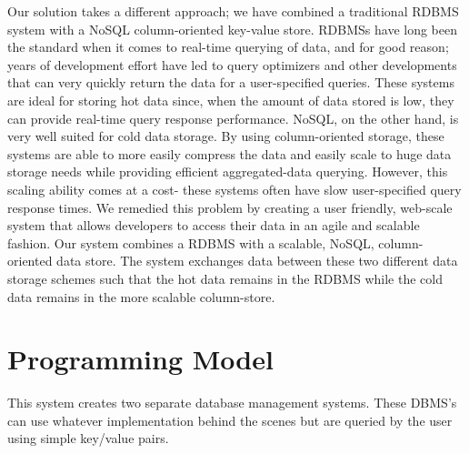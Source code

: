 \documentclass[12pt]{article}
\begin{document}
Our solution takes a different approach; we have combined a traditional RDBMS system with a NoSQL column-oriented key-value store. RDBMSs have long been the standard when it comes to real-time querying of data, and for good reason; years of development effort have led to query optimizers and other developments that can very quickly return the data for a user-specified queries. These systems are ideal for storing hot data since, when the amount of data stored is low, they can provide real-time query response performance. NoSQL, on the other hand, is very well suited for cold data storage. By using column-oriented storage, these systems are able to more easily compress the data and easily scale to huge data storage needs while providing efficient aggregated-data querying. However, this scaling ability comes at a cost- these systems often have slow user-specified query response times.
We remedied this problem by creating a user friendly, web-scale system that allows developers to access their data in an agile and scalable fashion. Our system combines a RDBMS with a scalable, NoSQL, column-oriented data store. The system exchanges data between these two different data storage schemes such that the hot data remains in the RDBMS while the cold data remains in the more scalable column-store.


\section{Programming Model}
This system creates two separate database management systems. These DBMS’s can use whatever implementation behind the scenes but are queried by the user using simple key/value pairs.
\end{document}
